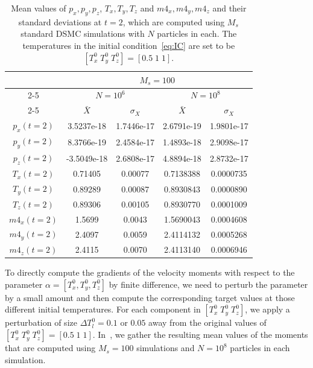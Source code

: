 \documentclass[times,final,nopreprintline]{elsarticle}
\begin{document}
 \begin{table} %
\small \renewcommand{\arraystretch}{1.0}
\centering 
\begin{tabular}{|c|c|c|c|c|}  
  \hline
  &  \multicolumn{4}{|c|}{$M_s=100$} \\ 
  \cline{2-5}
  &  \multicolumn{2}{|c|}{$N=10^6$} &  \multicolumn{2}{|c|}{$N=10^8$} \\ 
  \cline{2-5}
  & \rule{0pt}{10pt}  $\bar{X}$ & $\sigma_{X}$ & $\bar{X}$ & $\sigma_{X}$ \\
  \hline
$p_x(t=2)$  & 3.5237e-18 & 1.7446e-17  & 2.6791e-19 & 1.9801e-17 \\
$p_y(t=2)$  & 8.3766e-19 & 2.4584e-17  & 1.4893e-18 & 2.9098e-17  \\
$p_z(t=2)$  &-3.5049e-18 & 2.6808e-17  & 4.8894e-18 & 2.8732e-17  \\ 
$T_x(t=2)$  & 0.71405 & 0.00077  & 0.7138388 & 0.0000735 \\
$T_y(t=2)$  & 0.89289 & 0.00087  & 0.8930843 & 0.0000890 \\
$T_z(t=2)$  & 0.89306 & 0.00105  & 0.8930770 & 0.0001009 \\
$m4_x(t=2)$ & 1.5699  & 0.0043   & 1.5690043 & 0.0004608 \\ 
$m4_y(t=2)$ & 2.4097  & 0.0059   & 2.4114132 & 0.0005268 \\  
$m4_z(t=2)$ & 2.4115  & 0.0070   & 2.4113140 & 0.0006946 \\
   \hline
\end{tabular}
  \caption{Mean values of $p_x, p_y, p_z$, $T_x, T_y, T_z$ and $m4_x, m4_y, m4_z$ and their standard deviations at $t=2$, which are computed using $M_s$ standard DSMC simulations with $N$ particles in each. The temperatures in the initial condition~\eqref{eq:IC} are set to be $[T_x^0 \; T_y^0 \; T_z^0]=[0.5 \; 1 \; 1]$.}\label{Table1}
\end{table}
 
To directly compute the gradients of the velocity moments with respect to the parameter $\alpha=[T_x^0, T_y^0, T_z^0]$ by finite difference, we need to perturb the parameter by a small amount and then compute the corresponding target values at those different initial temperatures. For each component in $[T_x^0 \; T_y^0 \; T_z^0]$, we apply a perturbation of size $\Delta T_l^0=0.1$ or $0.05$ away from the original values of $[T_x^0 \; T_y^0 \; T_z^0]=[0.5 \; 1 \; 1]$. In~, we gather the resulting mean values of the moments that are computed using $M_s=100$ simulations and $N=10^8$ particles in each simulation. 
\end{document}
